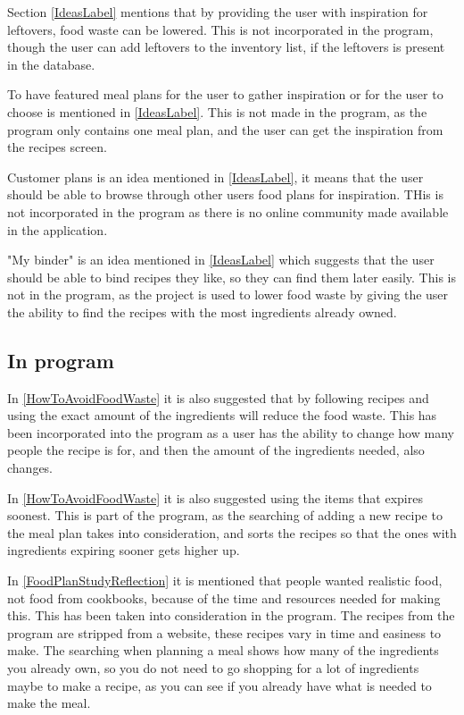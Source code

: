 Section \ref{IdeasLabel} mentions that by providing the user with inspiration for leftovers, food waste can be lowered. This is not incorporated in the program, though the user can add leftovers to the inventory list, if the leftovers is present in the database.

To have featured meal plans for the user to gather inspiration or for the user to choose is mentioned in \cref{IdeasLabel}. This is not made in the program, as the program only contains one meal plan, and the user can get the inspiration from the recipes screen.

Customer plans is an idea mentioned in \cref{IdeasLabel}, it means that the user should be able to browse through other users food plans for inspiration. THis is not incorporated in the program as there is no online community made available in the application.

"My binder" is an idea mentioned in \cref{IdeasLabel} which suggests that the user should be able to bind recipes they like, so they can find them later easily. This is not in the program, as the project is used to lower food waste by giving the user the ability to find the recipes with the most ingredients already owned.

\subsection{In program}

In \cref{HowToAvoidFoodWaste} it is also suggested that by following recipes and using the exact amount of the ingredients will reduce the food waste. This has been incorporated into the program as a user has the ability to change how many people the recipe is for, and then the amount of the ingredients needed, also changes.

In \cref{HowToAvoidFoodWaste} it is also suggested using the items that expires soonest. This is part of the program, as the searching of adding a new recipe to the meal plan takes into consideration, and sorts the recipes so that the ones with ingredients expiring sooner gets higher up.

In \cref{FoodPlanStudyReflection} it is mentioned that people wanted realistic food, not food from cookbooks, because of the time and resources needed for making this. This has been taken into consideration in the program. The recipes from the program are stripped from a website, these recipes vary in time and easiness to make. The searching when planning a meal shows how many of the ingredients you already own, so you do not need to go shopping for a lot of ingredients maybe to make a recipe, as you can see if you already have what is needed to make the meal.

